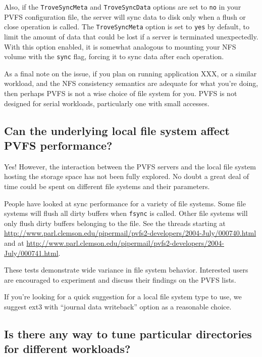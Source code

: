 \documentclass[11pt,letterpaper]{article}
\begin{document}
Also, if the \texttt{TroveSyncMeta} and \texttt{TroveSyncData} options
are set to \texttt{no} in your PVFS configuration file, the server
will sync data to disk only when a flush or close operation is called.
The \texttt{TroveSyncMeta} option is set to \texttt{yes} by default, 
to limit the amount of
data that could be lost if a server is terminated unexpectedly.  With
this option enabled, it is somewhat analogous to mounting your NFS
volume with the \texttt{sync} flag, forcing it to sync data after each
operation.

As a final note on the issue, if you plan on running application XXX,
or a similar workload, and the NFS consistency semantics are adequate
for what you're doing, then perhaps PVFS is not a wise choice of file
system for you.  PVFS is not designed for serial workloads,
particularly one with small accesses.

\subsection{Can the underlying local file system affect PVFS performance?}
\label{sec:local_fs}

Yes!  However, the interaction between the PVFS servers and the local
file system hosting the storage space has not been fully explored.  No
doubt a great deal of time could be spent on different file systems
and their parameters.

People have looked at sync performance for a variety of file systems.
Some file systems will flush all dirty buffers when \texttt{fsync} is
called.  Other file systems will only flush dirty buffers belonging to
the file. See the threads starting at
\url{http://www.parl.clemson.edu/pipermail/pvfs2-developers/2004-July/000740.html}
and at
\url{http://www.parl.clemson.edu/pipermail/pvfs2-developers/2004-July/000741.html}.

These tests demonstrate wide variance in file system behavior.
Interested users are encouraged to experiment and discuss their
findings on the PVFS lists.

If you're looking for a quick suggestion for a local file system type
to use, we suggest ext3 with ``journal data writeback'' option as a
reasonable choice.

\subsection{Is there any way to tune particular directories for different
workloads?}
\label{sec:dir_tuning}
\end{document}
